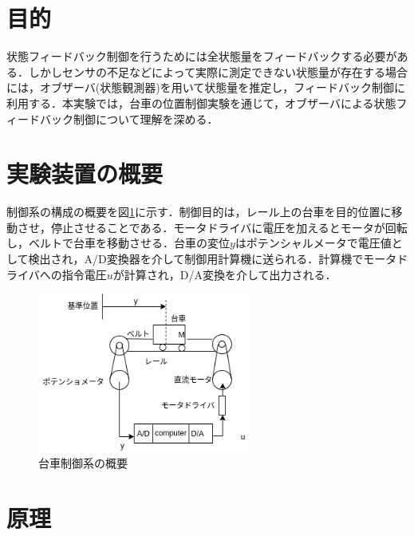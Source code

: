 \documentclass[12pt]{jsarticle}
\begin{document}
\section{目的}
状態フィードバック制御を行うためには全状態量をフィードバックする必要がある．しかしセンサの不足などによって実際に測定できない状態量が存在する場合には，オブザーバ(状態観測器)を用いて状態量を推定し，フィードバック制御に利用する．本実験では，台車の位置制御実験を通じて，オブザーバによる状態フィードバック制御について理解を深める．
\section{実験装置の概要}
制御系の構成の概要を図\ref{B2-1}に示す．制御目的は，レール上の台車を目的位置に移動させ，停止させることである．モータドライバに電圧を加えるとモータが回転し，ベルトで台車を移動させる．台車の変位$y$はポテンシャルメータで電圧値として検出され，A/D変換器を介して制御用計算機に送られる．計算機でモータドライバへの指令電圧$u$が計算され，D/A変換を介して出力される．
\begin{figure}[H]
  \begin{center}
    \includegraphics[clip,width=7.0cm]{../img/B2-1.png}
    \caption{台車制御系の概要}
    \label{B2-1}
  \end{center}
\end{figure}
\section{原理}
\end{document}
